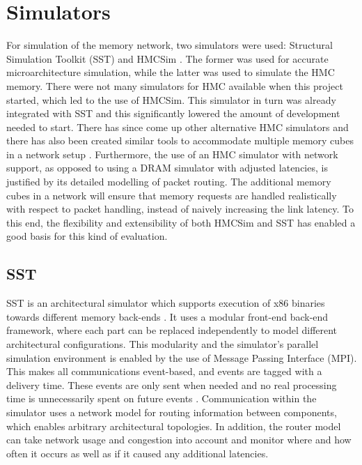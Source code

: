 \section{Simulators}
For simulation of the memory network, two simulators were used: Structural Simulation Toolkit (SST) \cite{rodrigues2011structural} and HMCSim \cite{6969550}. The former was used for accurate microarchitecture simulation, while the latter was used to simulate the HMC memory. There were not many simulators for HMC available when this project started, which led to the use of HMCSim. This simulator in turn was already integrated with SST and this significantly lowered the amount of development needed to start. There has since come up other alternative HMC simulators \cite{7544479, Yang:2018:HCH:3240302.3240319} and there has also been created similar tools to accommodate multiple memory cubes in a network setup \cite{Siegl:2017:BAF:3132402.3132403}. Furthermore, the use of an HMC simulator with network support, as opposed to using a DRAM simulator with adjusted latencies, is justified by its detailed modelling of packet routing. The additional memory cubes in a network will ensure that memory requests are handled realistically with respect to packet handling, instead of naively increasing the link latency. To this end, the flexibility and extensibility of both HMCSim and SST has enabled a good basis for this kind of evaluation.
\bigskip

\subsection{SST}
SST is an architectural simulator which supports execution of x86 binaries towards different memory back-ends \cite{rodrigues2011structural}. It uses a modular front-end back-end framework, where each part can be replaced independently to model different architectural configurations. This modularity and the simulator's parallel simulation environment is enabled by the use of Message Passing Interface (MPI). This makes all communications event-based, and events are tagged with a delivery time. These events are only sent when needed and no real processing time is unnecessarily spent on future events \cite{11.1093/comjnl/bxr069}. Communication within the simulator uses a network model for routing information between components, which enables arbitrary architectural topologies. In addition, the router model can take network usage and congestion into account and monitor where and how often it occurs as well as if it caused any additional latencies.
\bigskip


